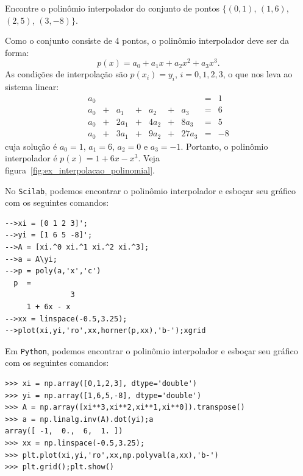 \begin{ex}\label{ex:interpolacao_polinomial} Encontre o polinômio interpolador do conjunto de pontos $\{(0, 1)$, $(1, 6)$, $(2, 5)$, $(3, -8)\}$.
\end{ex}
\begin{sol}
Como o conjunto consiste de 4 pontos, o polinômio interpolador deve ser da forma:
\begin{equation*}
  p(x) = a_0 + a_1x + a_2x^2 + a_3x^3.
\end{equation*}
As condições de interpolação são $p(x_i) = y_i$, $i = 0, 1, 2, 3$, o que nos leva ao sistema linear:
\begin{equation*}
  \begin{array}{lclclclcl}
    a_0& & & & & & &=&1\\
    a_0&+& a_1&+& a_2&+&  a_3&=&6\\
    a_0&+&2a_1&+&4a_2&+& 8a_3&=&5\\
    a_0&+&3a_1&+&9a_2&+&27a_3&=&-8
  \end{array}
\end{equation*}
cuja solução é $a_0=1$, $a_1=6$, $a_2=0$ e $a_3=-1$. Portanto, o polinômio interpolador é $p(x)=1+6x-x^3$. Veja figura~\ref{fig:ex_interpolacao_polinomial}.

\ifisscilab
No \verb+Scilab+, podemos encontrar o polinômio interpolador e esboçar seu gráfico com os seguintes comandos:
\begin{verbatim}
-->xi = [0 1 2 3]';
-->yi = [1 6 5 -8]'; 
-->A = [xi.^0 xi.^1 xi.^2 xi.^3];
-->a = A\yi; 
-->p = poly(a,'x','c') 
  p  =
               3
     1 + 6x - x   
-->xx = linspace(-0.5,3.25); 
-->plot(xi,yi,'ro',xx,horner(p,xx),'b-');xgrid
\end{verbatim}
\fi
\ifispython
Em \verb+Python+, podemos encontrar o polinômio interpolador e esboçar seu gráfico com os seguintes comandos:
\begin{verbatim}
>>> xi = np.array([0,1,2,3], dtype='double')
>>> yi = np.array([1,6,5,-8], dtype='double')
>>> A = np.array([xi**3,xi**2,xi**1,xi**0]).transpose()
>>> a = np.linalg.inv(A).dot(yi);a
array([ -1,  0.,  6,  1. ])
>>> xx = np.linspace(-0.5,3.25); 
>>> plt.plot(xi,yi,'ro',xx,np.polyval(a,xx),'b-')
>>> plt.grid();plt.show()
\end{verbatim}
\fi
\end{sol}


